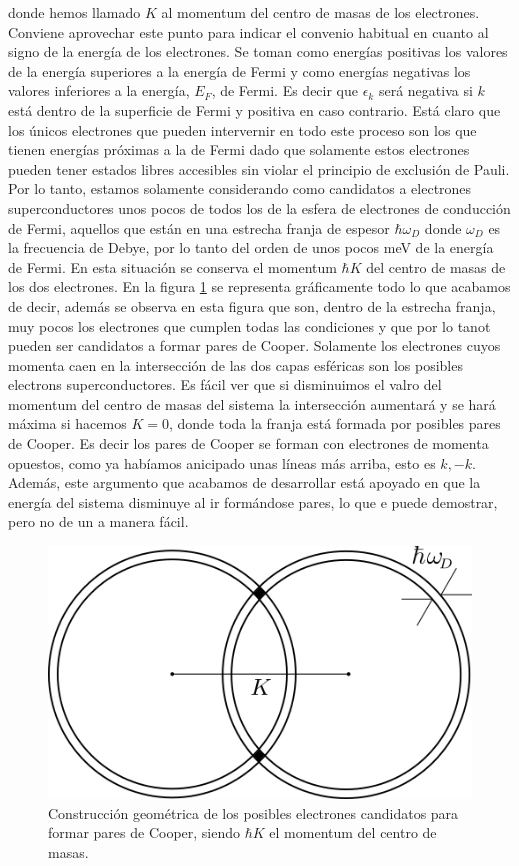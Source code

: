 donde hemos llamado $K$ al momentum del centro de masas de los electrones. Conviene aprovechar este punto para indicar el convenio habitual en cuanto al signo de la energía de los electrones. Se toman como energías positivas los valores de la energía superiores a la energía de Fermi y como energías negativas los valores inferiores a la energía, $E_F$, de Fermi. Es decir que $\epsilon_k$ será negativa si $k$ está dentro de la superficie de Fermi y positiva en caso contrario. Está claro que los únicos electrones que pueden intervernir en todo este proceso son los que tienen energías próximas a la de Fermi dado que solamente estos electrones pueden tener estados libres accesibles sin violar el principio de exclusión de Pauli. Por lo tanto, estamos solamente considerando como candidatos a electrones superconductores unos pocos de todos los de la esfera de electrones de conducción de Fermi, aquellos que están en una estrecha franja de espesor $\hbar \omega_D$ donde $\omega_D$ es la frecuencia de Debye, por lo tanto del orden de unos pocos meV de la energía de Fermi. En esta situación se conserva el momentum $\hbar K$ del centro de masas de los dos electrones. En la figura \ref{fig:goodcooper} se representa gráficamente todo lo que acabamos de decir, además se observa en esta figura que son, dentro de la estrecha franja, muy pocos los electrones que cumplen todas las condiciones y que por lo tanot pueden ser candidatos a formar pares de Cooper. Solamente los electrones cuyos momenta caen en la intersección de las dos capas esféricas son los posibles electrons superconductores. Es fácil ver que si disminuimos el valro del momentum del centro de masas del sistema la intersección aumentará y se hará máxima si hacemos $K = 0$, donde toda la franja está formada por posibles pares de Cooper. Es decir los pares de Cooper se forman con electrones de momenta opuestos, como ya habíamos anicipado unas líneas más arriba, esto es $k, -k$.  Además, este argumento que acabamos de desarrollar está apoyado en que la energía del sistema disminuye al ir formándose pares, lo que e puede demostrar, pero no de un a manera fácil.

\begin{figure}[H]
\centering \includegraphics[width=0.6\linewidth]{img/goodcooper.png}
\caption{Construcción geométrica de los posibles electrones candidatos para formar pares de Cooper, siendo $\hbar K$ el momentum del centro de masas.}
\label{fig:goodcooper}
\end{figure}

